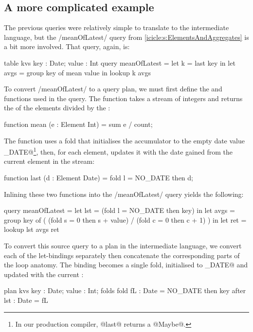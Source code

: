 \subsection{A more complicated example}

The previous queries were relatively simple to translate to the intermediate language, but the \Hs/meanOfLatest/ query from \cref{icicle:s:ElementsAndAggregates} is a bit more involved.
That query, again, is:

\begin{icicle}
  table kvs { key : Date; value : Int } 
  query meanOfLatest
   = let k    = last  key in
     let avgs = group key of mean value in
     lookup k avgs
\end{icicle}

To convert \Hs/meanOfLatest/ to a query plan, we must first define the \IcC@mean@ and \IcC@last@ functions used in the query.
The \IcC@mean@ function takes a stream of integers and returns the \IcC@sum@ of the elements divided by the \IcC@count@:
\begin{icicle}
function mean (e : Element Int)
 = sum e / count;
\end{icicle}

The \IcC@last@ function uses a fold that initialises the accumulator to the empty date value \IcC@NO_DATE@\footnote{In our production compiler, @last@ returns a @Maybe@.}, then, for each element, updates it with the date gained from the current element in the stream:
\begin{icicle}
function last (d : Element Date)
 = fold l = NO_DATE then d;
\end{icicle}



Inlining these two functions into the \Hs/meanOfLatest/ query yields the following:
\begin{icicle}
query meanOfLatest
 = let lst  = (fold l = NO_DATE then key) in
   let avgs = group key of
              ( (fold s = 0 then s + value)
              / (fold c = 0 then c + 1) ) in
   let ret  = lookup lst avgs
   ret
\end{icicle}

To convert this source query to a plan in the intermediate language, we convert each of the let-bindings separately then concatenate the corresponding parts of the loop anatomy.
The \IcC@lst@ binding becomes a single fold, initialised to \IcC@NO_DATE@ and updated with the current \IcC@key@:
\begin{icicle-core}
plan kvs {      key : Date; value : Int;       }
folds    { fold fL  : Date = NO_DATE then key  }
after    {      lst : Date = fL                }
\end{icicle-core}

